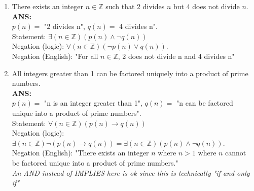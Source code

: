 \documentclass{article}
\begin{document}
\begin{enumerate}
\begin{enumerate}
        \item There exists an integer $n \in \mathbb{Z}$ such that 2 divides $n$ but 4 does not divide $n$. \\
        \textbf{ANS: } \\
        $p(n) = $ "2 divides n", $q(n) = $ 4 divides n". \\
        Statement: $\exists (n \in \mathbb{Z})(p(n) \land \neg q(n))$ \\
        Negation (logic): $\forall (n \in \mathbb{Z})(\neg p(n) \lor q(n))$. \\
        Negation (English): "For all $n \in \mathbb{Z}$, 2 does not divide n and 4 divides n" \\

        \item All integers greater than 1 can be factored uniquely into a product of prime numbers. \\
        \textbf{ANS: } \\
        $p(n) = $ "n is an integer greater than 1", $q(n) = $ "n can be factored unique into a product of prime numbers". \\
        Statement: $\forall (n \in \mathbb{Z})(p(n) \rightarrow q(n))$ \\
        Negation (logic): $\exists (n \in \mathbb{Z})\neg (p(n) \rightarrow q(n)) = \exists (n \in \mathbb{Z})(p(n) \land \neg q(n))$. \\
        Negation (English): "There exists an integer $n$ where $n > 1$ where $n$ cannot be factored unique into a product of prime numbers." \\
        \textit{An AND instead of IMPLIES here is ok since this is technically "if and only if"}


\end{enumerate}
\end{enumerate}
\end{document}
